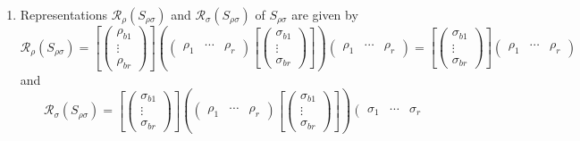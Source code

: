 \documentclass[aps,preprint]{revtex4}
\begin{document}
\begin{enumerate}
\item Representations $\mathcal{R}_{\rho }\left( S_{\rho \sigma }\right) $
and $\mathcal{R}_{\sigma }\left( S_{\rho \sigma }\right) $ of $S_{\rho
\sigma }$ are given by 
\begin{equation}
\mathcal{R}_{\rho }\left( S_{\rho \sigma }\right) =\left[ \left( 
\begin{array}{c}
\rho _{b1} \\ 
\vdots \\ 
\rho _{br}%
\end{array}%
\right) \right] \left( \overset{}{\left( 
\begin{array}{ccc}
\rho _{1} & \cdots & \rho _{r}%
\end{array}%
\right) \left[ \left( 
\begin{array}{c}
\sigma _{b1} \\ 
\vdots \\ 
\sigma _{br}%
\end{array}%
\right) \right] }\right) \left( 
\begin{array}{ccc}
\rho _{1} & \cdots & \rho _{r}%
\end{array}%
\right) =\left[ \left( 
\begin{array}{c}
\sigma _{b1} \\ 
\vdots \\ 
\sigma _{br}%
\end{array}%
\right) \right] \left( 
\begin{array}{ccc}
\rho _{1} & \cdots & \rho _{r}%
\end{array}%
\right)
\end{equation}%
and 
\begin{equation}
\mathcal{R}_{\sigma }\left( S_{\rho \sigma }\right) =\left[ \left( 
\begin{array}{c}
\sigma _{b1} \\ 
\vdots \\ 
\sigma _{br}%
\end{array}%
\right) \right] \left( \overset{}{\left( 
\begin{array}{ccc}
\rho _{1} & \cdots & \rho _{r}%
\end{array}%
\right) \left[ \left( 
\begin{array}{c}
\sigma _{b1} \\ 
\vdots \\ 
\sigma _{br}%
\end{array}%
\right) \right] }\right) \left( 
\begin{array}{ccc}
\sigma _{1} & \cdots & \sigma _{r}%
\end{array}%

\end{equation}
\end{enumerate}
\end{document}
